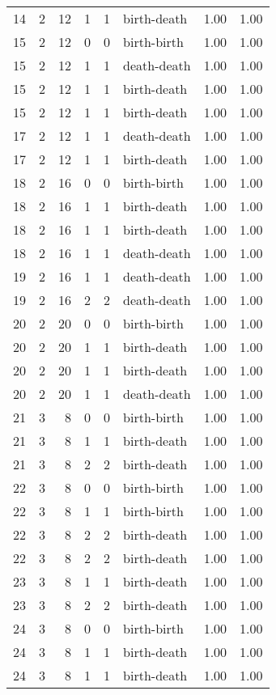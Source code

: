 \documentclass{article}
\begin{document}
\begin{center}
\begin{tabular}{rrrrrlrr}
14 & 2 & 12 & 1 & 1 & birth-death & 1.00 & 1.00 \\
15 & 2 & 12 & 0 & 0 & birth-birth & 1.00 & 1.00 \\
15 & 2 & 12 & 1 & 1 & death-death & 1.00 & 1.00 \\
15 & 2 & 12 & 1 & 1 & birth-death & 1.00 & 1.00 \\
15 & 2 & 12 & 1 & 1 & birth-death & 1.00 & 1.00 \\
17 & 2 & 12 & 1 & 1 & death-death & 1.00 & 1.00 \\
17 & 2 & 12 & 1 & 1 & birth-death & 1.00 & 1.00 \\
18 & 2 & 16 & 0 & 0 & birth-birth & 1.00 & 1.00 \\
18 & 2 & 16 & 1 & 1 & birth-death & 1.00 & 1.00 \\
18 & 2 & 16 & 1 & 1 & birth-death & 1.00 & 1.00 \\
18 & 2 & 16 & 1 & 1 & death-death & 1.00 & 1.00 \\
19 & 2 & 16 & 1 & 1 & death-death & 1.00 & 1.00 \\
19 & 2 & 16 & 2 & 2 & death-death & 1.00 & 1.00 \\
20 & 2 & 20 & 0 & 0 & birth-birth & 1.00 & 1.00 \\
20 & 2 & 20 & 1 & 1 & birth-death & 1.00 & 1.00 \\
20 & 2 & 20 & 1 & 1 & birth-death & 1.00 & 1.00 \\
20 & 2 & 20 & 1 & 1 & death-death & 1.00 & 1.00 \\
21 & 3 & 8 & 0 & 0 & birth-birth & 1.00 & 1.00 \\
21 & 3 & 8 & 1 & 1 & birth-death & 1.00 & 1.00 \\
21 & 3 & 8 & 2 & 2 & birth-death & 1.00 & 1.00 \\
22 & 3 & 8 & 0 & 0 & birth-birth & 1.00 & 1.00 \\
22 & 3 & 8 & 1 & 1 & birth-birth & 1.00 & 1.00 \\
22 & 3 & 8 & 2 & 2 & birth-death & 1.00 & 1.00 \\
22 & 3 & 8 & 2 & 2 & birth-death & 1.00 & 1.00 \\
23 & 3 & 8 & 1 & 1 & birth-death & 1.00 & 1.00 \\
23 & 3 & 8 & 2 & 2 & birth-death & 1.00 & 1.00 \\
24 & 3 & 8 & 0 & 0 & birth-birth & 1.00 & 1.00 \\
24 & 3 & 8 & 1 & 1 & birth-death & 1.00 & 1.00 \\
24 & 3 & 8 & 1 & 1 & birth-death & 1.00 & 1.00 \\

\end{tabular}
\end{center}
\end{document}
